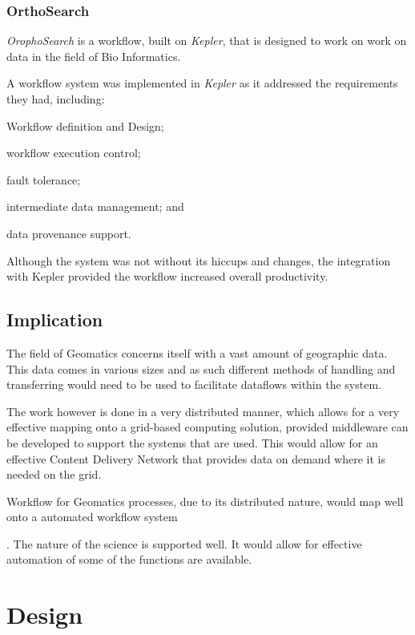 \documentclass[12pt,a4paper]{report}
\begin{document}
    \subsection*{OrthoSearch}
      \emph{OrophoSearch} is a workflow, built on \emph{Kepler}, that is
      designed to work on work on data in the field of Bio Informatics.
      \cite{daCruz:2008:OSW:1363686.1363983}

      A workflow system was implemented in \emph{Kepler} as it addressed the
      requirements they had, including: \begin{inparaenum}[(i)] \item Workflow
      definition and Design; \item workflow execution control; \item fault
      tolerance; \item intermediate data management; and \item data provenance
      support.  \end{inparaenum}

      Although the system was not without its hiccups and changes, the
      integration with Kepler provided the workflow increased overall
      productivity.


\section{Implication}
The field of Geomatics concerns itself with a vast amount of geographic data.
This data comes in various sizes and as such different methods of handling and
transferring would need to be used to facilitate dataflows within the system.

The work however is done in a very distributed manner, which allows for a very
effective mapping onto a grid-based computing solution, provided middleware can
be developed to support the systems that are
used\cite{Montella:2007:UGC:1272980.1272995}. This would allow for an
effective Content Delivery Network that provides data on demand where it is
needed on the grid.

Workflow for Geomatics processes, due to its distributed nature, would map well
onto a automated workflow system

\cite{Withana:2010:VWE:1851476.1851586}. The nature of the science is supported
well. It would allow for effective automation of some of the functions are
available.

\chapter{Design\label{chap2}}
\end{document}
